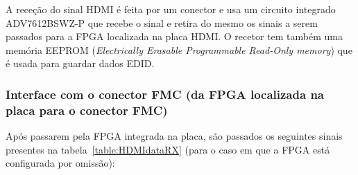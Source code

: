 A receção do sinal HDMI é feita por um conector e usa um circuito integrado ADV7612BSWZ-P que recebe o sinal e retira do mesmo os sinais a serem passados para a FPGA localizada na placa HDMI. O recetor tem também uma memória EEPROM (\textit{Electrically Erasable Programmable Read-Only memory}) que é usada para guardar dados EDID.
	
\subsubsection{Interface com o conector FMC (da FPGA localizada na placa para o conector FMC)}

Após passarem pela FPGA integrada na placa, são passados os seguintes sinais presentes na tabela~\ref{table:HDMIdataRX} (para o caso em que a FPGA está configurada por omissão):

